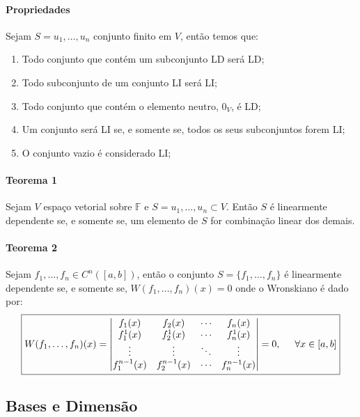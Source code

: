\documentclass{article}
\begin{document}
        \paragraph{Propriedades}Sejam $S={u_{1},\dots, u_{n}}$ conjunto finito em $V$, então temos que:
            \begin{enumerate}[noitemsep]
                \item Todo conjunto que contém um subconjunto LD será LD;
                \item Todo subconjunto de um conjunto LI será LI;
                \item Todo conjunto que contém o elemento neutro, $0_{V}$, é LD;
                \item Um conjunto será LI se, e somente se, todos os seus subconjuntos forem LI;
                \item O conjunto vazio é considerado LI;
            \end{enumerate}

        \paragraph{Teorema 1}Sejam $V$ espaço vetorial sobre $\mathbb{F}$ e $S={u_1,\dots,u_n}\subset V$. Então $S$ é linearmente dependente se, e somente se, um elemento de $S$ for combinação linear dos demais.

        \paragraph{Teorema 2}Sejam $f_{1},\dots, f_{n} \in C^{n}([a,b])$, então o conjunto $S = \{f_{1},\dots, f_{n}\}$ é linearmente dependente se, e somente se, $W(f_{1},\dots, f_{n})(x) = 0$ onde o Wronskiano é dado por:
            \[\boxed{W(f_{1},\dots, f_{n})(x) = 
            \begin{vmatrix}
                f_{1}(x)       & f_{2}(x)       & \cdots & f_{n}(x)\\
                f^{1}_{1}(x)   & f^{1}_{2}(x)   & \cdots & f^{1}_{n}(x)\\
                \vdots         & \vdots         & \ddots & \vdots\\
                f^{n-1}_{1}(x) & f^{n-1}_{2}(x) & \cdots & f^{n-1}_{n}(x)\\
            \end{vmatrix}=0, \hspace{5mm}\forall x \in [a,b]}\]

        \subsection{Bases e Dimensão}
\end{document}
